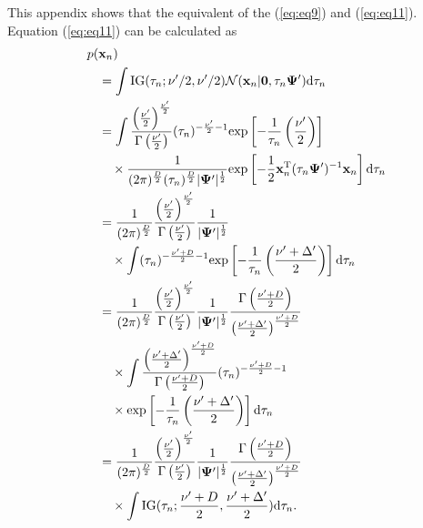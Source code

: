 \documentclass[journal]{IEEEtran}
\begin{document}
This appendix shows that the equivalent of the (\ref{eq:eq9}) and (\ref{eq:eq11}).
Equation (\ref{eq:eq11}) can be calculated as
\begin{align}
	p(&\mathbf{x}_n) \notag \\
	&= \int \mathrm{IG}(\tau_n;\nu'/2,\nu'/2) \mathcal{N}(\mathbf{x}_n|\mathbf{0}, \tau_n \mathbf{\Psi}') \mathrm{d}{\tau_n} \nonumber\\
	&= \int \frac{\left(\frac{\nu'}{2}\right)^{\frac{\nu'}{2}}}{\Gamma \left(\frac{\nu'}{2}\right)} (\tau_n)^{-\frac{\nu'}{2}-1} \mathrm{exp} \left[-\frac{1}{\tau_n} \left(\frac{\nu'}{2} \right) \right] \nonumber\\
	&\quad\times\frac{1}{(2\pi)^{\frac{D}{2}}(\tau_n)^{\frac{D}{2}}|\mathbf{\Psi'}|^{\frac{1}{2}}} \mathrm{exp} \left[-\frac{1}{2}\mathbf{x}_n^\mathrm{T} (\tau_n\mathbf{\Psi'})^{-1} \mathbf{x}_n\right] \mathrm{d}{\tau_n} \nonumber\\
	&=\frac{1}{(2\pi)^{\frac{D}{2}}}\frac{\left(\frac{\nu'}{2}\right)^{\frac{\nu'}{2}}}{\Gamma \left(\frac{\nu'}{2}\right)}\frac{1}{|\mathbf{\Psi'}|^{\frac{1}{2}}} \nonumber\\
	&\quad\times \int (\tau_n)^{-\frac{\nu'+D}{2}-1} \mathrm{exp} \left[-\frac{1}{\tau_n} \left(\frac{\nu' + \Delta'}{2}\right) \right] \mathrm{d}{\tau_n} \nonumber \\
    &=\frac{1}{(2\pi)^{\frac{D}{2}}}\frac{\left(\frac{\nu'}{2}\right)^{\frac{\nu'}{2}}}{\Gamma \left(\frac{\nu'}{2}\right)}\frac{1}{|\mathbf{\Psi'}|^{\frac{1}{2}}} \frac{\Gamma \left(\frac{\nu'+D}{2}\right)}{\left(\frac{\nu'+\Delta'}{2}\right)^{\frac{\nu'+D}{2}}}\nonumber\\
	&\quad\times \int \frac{\left(\frac{\nu'+\Delta'}{2}\right)^{\frac{\nu'+D}{2}}}{\Gamma \left(\frac{\nu'+D}{2}\right)} (\tau_n)^{-\frac{\nu'+D}{2}-1} \nonumber\\
	&\quad\times \mathrm{exp} \left[-\frac{1}{\tau_n} \left(\frac{\nu' + \Delta'}{2}\right) \right] \mathrm{d}{\tau_n} \nonumber\\
	&=\frac{1}{(2\pi)^{\frac{D}{2}}}\frac{\left(\frac{\nu'}{2}\right)^{\frac{\nu'}{2}}}{\Gamma \left(\frac{\nu'}{2}\right)}\frac{1}{|\mathbf{\Psi'}|^{\frac{1}{2}}} \frac{\Gamma \left(\frac{\nu'+D}{2}\right)}{\left(\frac{\nu'+\Delta'}{2}\right)^{\frac{\nu'+D}{2}}}\nonumber\\
	&\quad\times \int \mathrm{IG}(\tau_n;\frac{\nu'+D}{2},\frac{\nu'+\Delta'}{2}) \mathrm{d}{\tau_n}.
	\label{eq:20}
\end{align}
\end{document}
